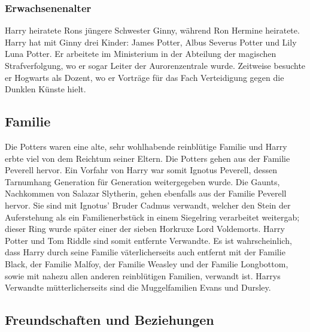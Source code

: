 \documentclass[a4paper, 10pt]{article}
\begin{document}
\subsubsection*{\large Erwachsenenalter}
Harry heiratete Rons jüngere Schwester Ginny, während Ron Hermine heiratete. Harry hat mit Ginny drei Kinder: James Potter, Albus Severus Potter und Lily Luna Potter. Er arbeitete im Ministerium in der Abteilung der magischen Strafverfolgung, wo er sogar Leiter der Aurorenzentrale wurde. Zeitweise besuchte er Hogwarts als Dozent, wo er Vorträge für das Fach Verteidigung gegen die Dunklen Künste hielt.
\subsection*{\Large Familie}
Die Potters waren eine alte, sehr wohlhabende reinblütige Familie und Harry erbte viel von dem Reichtum seiner Eltern. Die Potters gehen aus der Familie Peverell hervor. Ein Vorfahr von Harry war somit Ignotus Peverell, dessen Tarnumhang Generation für Generation weitergegeben wurde. Die Gaunts, Nachkommen von Salazar Slytherin, gehen ebenfalls aus der Familie Peverell hervor. Sie sind mit Ignotus' Bruder Cadmus verwandt, welcher den Stein der Auferstehung als ein Familienerbstück in einem Siegelring verarbeitet weitergab; dieser Ring wurde später einer der sieben Horkruxe Lord Voldemorts. Harry Potter und Tom Riddle sind somit entfernte Verwandte.
\vspace{10pt}
\newline
Es ist wahrscheinlich, dass Harry durch seine Familie väterlicherseits auch entfernt mit der Familie Black, der Familie Malfoy, der Familie Weasley und der Familie Longbottom, sowie mit nahezu allen anderen reinblütigen Familien, verwandt ist. Harrys Verwandte mütterlicherseits sind die Muggelfamilien Evans und Dursley.
\subsection*{\Large Freundschaften und Beziehungen}
\vspace{5pt}
\end{document}
